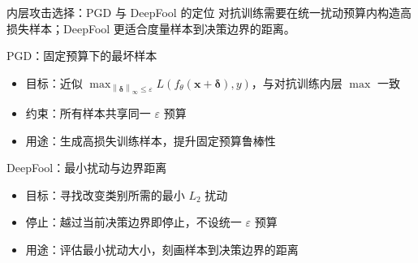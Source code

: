 \documentclass[aspectratio=169,11pt]{beamer}
\newcommand{\norm}[1]{\left\lVert #1 \right\rVert}
\newcommand{\bx}{\boldsymbol{x}}
\newcommand{\bdelta}{\boldsymbol{\delta}}
\begin{document}
\begin{frame}{内层攻击选择：PGD 与 DeepFool 的定位}
  \small
  对抗训练需要在统一扰动预算内构造高损失样本；DeepFool 更适合度量样本到决策边界的距离。
  \vspace{0.4em}

  \begin{block}{PGD：固定预算下的最坏样本}
    \footnotesize
    \begin{itemize}
      \item 目标：近似
            $\max_{\norm{\bdelta}_\infty \le \varepsilon}
            L(f_\theta(\bx+\bdelta),y)$，与对抗训练内层 $\max$ 一致
      \item 约束：所有样本共享同一 $\varepsilon$ 预算
      \item 用途：生成高损失训练样本，提升固定预算鲁棒性
    \end{itemize}
  \end{block}

  \vspace{0.35em}

  \begin{block}{DeepFool：最小扰动与边界距离}
    \footnotesize
    \begin{itemize}
      \item 目标：寻找改变类别所需的最小 $L_2$ 扰动
      \item 停止：越过当前决策边界即停止，不设统一 $\varepsilon$ 预算
      \item 用途：评估最小扰动大小，刻画样本到决策边界的距离
    \end{itemize}
  \end{block}
\end{frame}
\end{document}
